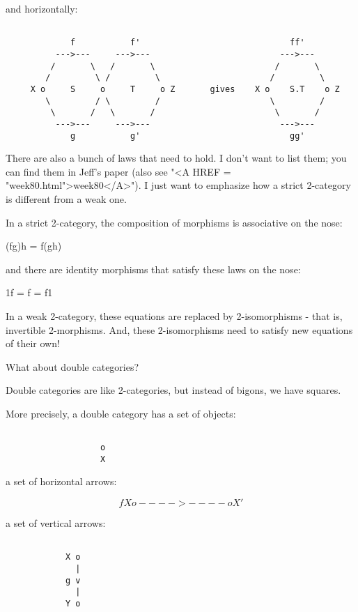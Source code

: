 and horizontally:


\begin{verbatim}

             f           f'                              ff'
          --->---     --->---                          --->--- 
         /       \   /       \                        /       \
        /         \ /         \                      /         \
     X o     S     o     T     o Z       gives    X o    S.T    o Z
        \         / \         /                      \         /
         \       /   \       /                        \       / 
          --->---     --->---                          --->---
             g           g'                              gg'
\end{verbatim}
    

There are also a bunch of laws that need to hold.  I don't want to
list them; you can find them in Jeff's paper (also see "<A HREF =
"week80.html">week80</A>").  I just want to emphasize how a
strict 2-category is different from a weak one.

In a strict 2-category, the composition of morphisms is associative
on the nose:

(fg)h = f(gh)

and there are identity morphisms that satisfy these laws on the nose:

1f = f = f1 

In a weak 2-category, these equations are replaced by 2-isomorphisms - that 
is, invertible 2-morphisms.  And, these 2-isomorphisms need to satisfy new 
equations of their own!

What about double categories?

Double categories are like 2-categories, but instead of bigons, we have 
squares.  

More precisely, a double category has a set of objects:


\begin{verbatim}

                   o 
                   X
\end{verbatim}
    
a set of horizontal arrows:


$$

                   f           
            X o---->----o X'
$$
    
a set of vertical arrows:


\begin{verbatim}

            X o
              |
            g v
              |
            Y o
\end{verbatim}
    
